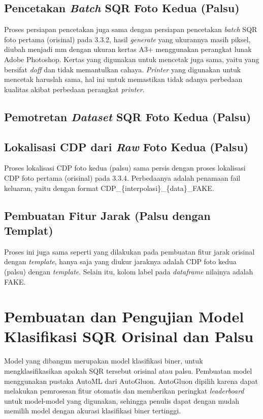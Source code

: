\subsection{Pencetakan \emph{Batch} SQR Foto Kedua (Palsu)}
Proses persiapan pencetakan juga sama dengan persiapan pencetakan \emph{batch} SQR foto pertama (orisinal) pada 3.3.2, hasil \emph{generate} yang ukurannya masih piksel, diubah menjadi mm dengan ukuran kertas A3+ menggunakan perangkat lunak Adobe Photoshop. Kertas yang digunakan untuk mencetak juga sama, yaitu yang bersifat \emph{doff} dan tidak memantulkan cahaya. \emph{Printer} yang digunakan untuk mencetak haruslah sama, hal ini untuk memastikan tidak adanya perbedaan kualitas akibat perbedaan perangkat \emph{printer}.

\subsection{Pemotretan \emph{Dataset} SQR Foto Kedua (Palsu)}

\subsection{Lokalisasi CDP dari \emph{Raw} Foto Kedua (Palsu)}
Proses lokalisasi CDP foto kedua (palsu) sama persis dengan proses lokalisasi CDP foto pertama (orisinal) pada 3.3.4. Perbedaanya adalah penamaan fail keluaran, yaitu dengan format CDP\_\{interpolasi\}\_\{data\}\_FAKE.

\subsection{Pembuatan Fitur Jarak (Palsu dengan Templat)}
Proses ini juga sama seperti yang dilakukan pada pembuatan fitur jarak orisinal dengan \emph{template}, hanya saja yang diukur jaraknya adalah CDP foto kedua (palsu) dengan \emph{template}. Selain itu, kolom label pada \emph{dataframe} nilainya adalah FAKE.

\section{Pembuatan dan Pengujian Model Klasifikasi SQR Orisinal dan Palsu}
Model yang dibangun merupakan model klasifikasi biner, untuk mengklasifikasikan apakah SQR tersebut orisinal atau palsu. Pembuatan model menggunakan pustaka AutoML dari AutoGluon. AutoGluon dipilih karena dapat melakukan pemrosesan fitur otomatis dan memberikan peringkat \emph{leaderboard} untuk model-model yang digunakan, sehingga penulis dapat dengan mudah memilih model dengan akurasi klasifikasi biner tertinggi.

